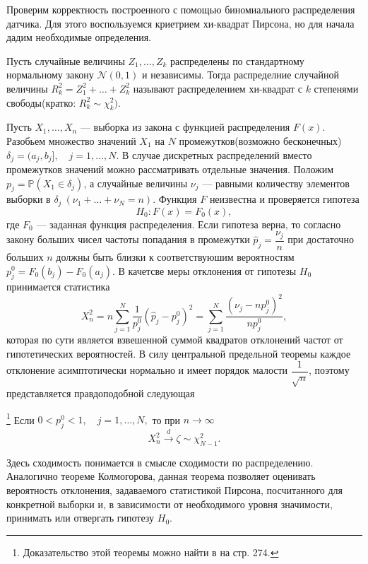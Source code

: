 Проверим корректность построенного с помощью биномиального распределения датчика.
 Для этого воспользуемся криетрием хи-квадрат Пирсона, но для начала дадим
 необходимые определения.
\begin{definition}
	Пусть случайные величины $ Z_1, \dots, Z_k $ распределены по стандартному
	 нормальному закону $ \mathcal{N}(0,1) $ и независимы. Тогда распределние
	 случайной величины $ R_k^2 = Z_1^2 + \dots + Z_k^2 $ называют распределением
	 хи-квадрат с $ k $ степенями свободы(кратко: $ R_k^2 \sim \chi_k^2) $. 
\end{definition}
Пусть $ X_1, \dots, X_n $ --- выборка из закона с функцией распределения $ F(x) $.
 Разобьем множество значений $ X_1 $ на $ N $ промежутков(возможно бесконечных)
 $ \delta_j = (a_j, b_j], \quad j = 1, \dots, N$. В случае дискретных распределений
 вместо промежутков значений можно рассматривать отдельные значения. 
 Положим $ p_j = \mathbb{P}(X_1 \in \delta_j) $, а случайные величины $ \nu_j $ ---
 равными количеству элементов выборки в $ \delta_j \ (\nu_1 + \dots + \nu_N = n) $.
 Функция $ F $ неизвестна и проверяется гипотеза
$$
 H_0: F(x) = F_0(x),
$$
 где $ F_0 $ --- заданная функция распределения. Если гипотеза верна, то согласно
 закону больших чисел частоты попадания в промежутки $ \hat{p}_j = \dfrac{\nu_j}{n} $
 при достаточно больших $ n $ должны быть близки к соответствуюшим вероятностям
 $ p_j^0 = F_0(b_j) - F_0(a_j) $. В качетсве меры отклонения от гипотезы $ H_0 $
 принимается статистика
$$
X_n^2 = n \sum_{j = 1}^N \frac{1}{p_j^0}(\hat{p}_j - p_j^0)^2 = \sum_{j = 1}^N
 \frac{(\nu_j - np_j^0)^2}{np_j^0},
$$
которая по сути является взвешенной суммой квадратов отклонений частот от
 гипотетических вероятностей. В силу центральной предельной теоремы
 каждое отклонение асимптотически нормально и имеет порядок малости
 $ \dfrac{1}{\sqrt{n}} $, поэтому представляется правдоподобной следующая
\begin{theorem}\footnote{ Доказательство этой теоремы можно найти в
	 \cite{lagutin_stat} на стр. 274.}
	Если $ 0 < p_j^0 < 1, \quad j = 1, \dots, N,$ то при $ n \to \infty $
	$$
	X_n^2 \xrightarrow{d} \zeta \sim \chi_{N-1}^2.
	$$
\end{theorem}
Здесь сходимость понимается в смысле сходимости по распределению. Аналогично теореме
 Колмогорова, данная теорема позволяет оценивать вероятность отклонения, задаваемого
 статистикой Пирсона, посчитанного для конкретной выборки и, в зависимости от
 необходимого уровня значимости, принимать или отвергать гипотезу $ H_0 $.

